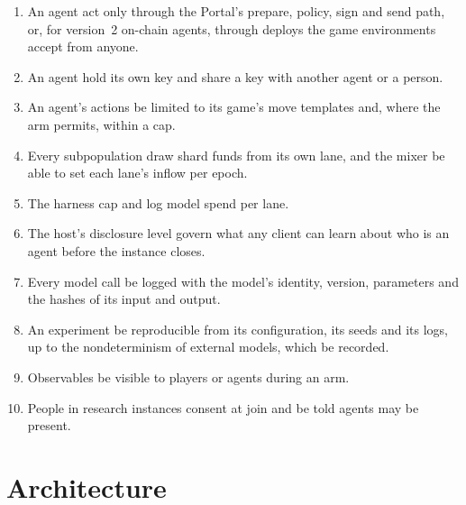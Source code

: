 \documentclass[11pt,a4paper]{article}
\begin{document}
\begin{enumerate}[label=\textbf{R\arabic*},leftmargin=2.6em,itemsep=2pt]
\item An agent \MUST{} act only through the Portal's prepare, policy, sign and send path, or, for
  version~2 on-chain agents, through deploys the game environments accept from anyone.
\item An agent \MUST{} hold its own key and \MUSTNOT{} share a key with another agent or a person.
\item An agent's actions \MUST{} be limited to its game's move templates and, where the arm permits,
   within a cap.
\item Every subpopulation \MUST{} draw shard funds from its own lane, and the mixer \MUST{} be able to
  set each lane's inflow per epoch.
\item The harness \MUST{} cap and log model spend per lane.
\item The host's disclosure level \MUST{} govern what any client can learn about who is an agent
  before the instance closes.
\item Every model call \MUST{} be logged with the model's identity, version, parameters and the
  hashes of its input and output.
\item An experiment \MUST{} be reproducible from its configuration, its seeds and its logs, up to the
  nondeterminism of external models, which \MUST{} be recorded.
\item Observables \MUSTNOT{} be visible to players or agents during an arm.
\item People in research instances \MUST{} consent at join and \MUST{} be told agents may be present.
\end{enumerate}

\section{Architecture}\label{sec:arch}
\end{document}

